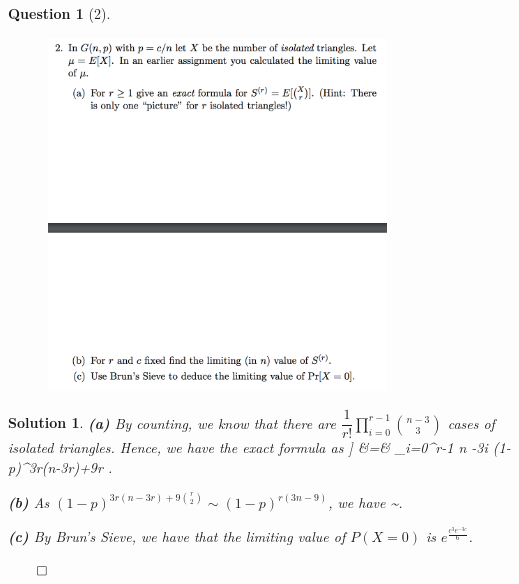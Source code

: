 \documentclass{article} %
\def\eQb#1\eQe{\begin{eqnarray*}#1\end{eqnarray*}}
\theoremstyle{quest}
\newtheorem*{question}{Question}
\newtheorem*{solution}{Solution}
\begin{document}
\newpage

\begin{question}[2]
\hfill
\begin{figure}[h!]
  \centering
    \includegraphics[width=0.8\textwidth]{pm-5-2.png}
\end{figure}
\end{question}
\begin{solution}
\textbf{(a)}
By counting, we know that there are $\dfrac{1}{r!}\prod_{i=0}^{r-1}{ n-3 
\choose 3}$ cases of isolated triangles. Hence, we have the exact formula as
\eQb
E{X \choose r}] &=&  \prod_{i=0}^{r-1} {n -3i } (1-p)^{3r(n-3r)+9{r }}.
\eQe

\bigskip

\textbf{(b)} As $(1-p)^{3r(n-3r)+9{r \choose 2}} \sim (1-p)^{r(3n-9)}$, we have
\eQb
E[X] \sim {}.
\eQe 

\bigskip

\textbf{(c)} By Brun's Sieve, we have that the limiting value of $P(X = 0)$ is
$e^{\frac{c^3e^{-3c}}{6}}$.
 
\hfill $\qed$

\end{solution}

\newpage
\end{document}
